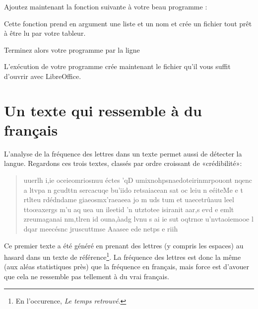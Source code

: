Ajoutez maintenant la fonction suivante à votre beau programme :



Cette fonction prend en argument une liste  et un nom  et crée un fichier tout prêt à être lu par votre tableur. 

Terminez alors votre programme par la ligne
\begin{quote}
\end{quote}
L'exécution de votre programme crée maintenant le fichier  qu'il vous suffit d'ouvrir avec LibreOffice.

\section{Un texte qui ressemble à du français}

L'analyse de la fréquence des lettres dans un texte permet aussi de détecter la langue. Regardons ces trois textes, classés par ordre croissant de «crédibilité»:

\begin{quote}
    uuerlh i,ie oceieomriosnuu éctes 'qD umixnohpsnaedoteirinmrpouont nqenc a ltvpa n gcudttn  sercacuqe bu'iido retsaiacean sat oc leiu n  eéiteMe e   t  rtlteu rdédndame giaeosmx'raeaeea  jo m uds tum   et uaecetrûauu leel ttoœaxergs m'u aq uea un ileetid 'n utztotee isiranit aar,s evd e emlt zreumaganai nm,tlren id ouna,àadg lvnu s ai ie sut oqtrnœ u'nvtaoiemooe l  dqar meecésnc  jruscuttmse Aaasee ede netps  e riih
\end{quote}
Ce premier texte a été généré en prenant des lettres (y compris les espaces) au hasard dans un texte de référence\footnote{En l'occurence, \emph{Le temps retrouvé}.}. La fréquence des lettres est donc la même (aux aléas statistiques près) que la fréquence en français, mais force est d'avouer que cela ne ressemble pas tellement à du vrai français.
 
